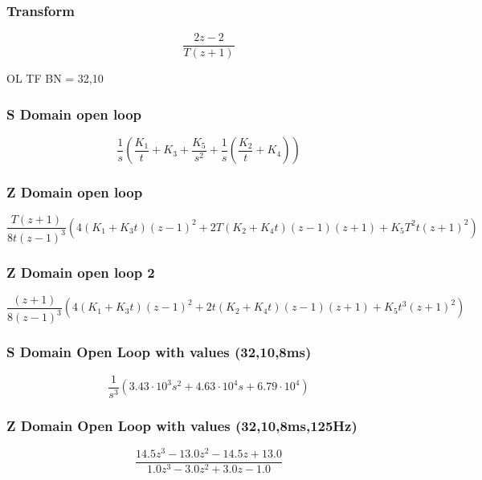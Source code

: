 \subsubsection{Transform}
\begin{equation}
\frac{2 z - 2}{T \left(z + 1\right)}
\end{equation}

OL TF BN = 32,10

\subsubsection{S Domain open loop}
\begin{equation}
\frac{1}{s} \left(\frac{K_{1}}{t} + K_{3} + \frac{K_{5}}{s^{2}} + \frac{1}{s} \left(\frac{K_{2}}{t} + K_{4}\right)\right)
\end{equation}

\subsubsection{Z Domain open loop}

\begin{equation}
\frac{T\left(z + 1\right) }{8 t \left(z - 1\right)^{3}} \left(4(K_{1}  + K_{3} t)  \left(z - 1\right)^{2}  + 2 T \left(K_{2} + K_{4} t\right) \left(z - 1\right) \left(z + 1\right) + K_{5} T^{2} t \left(z + 1\right)^{2} \right)
\end{equation}

\subsubsection{Z Domain open loop 2}
\begin{equation}
\frac{\left(z + 1\right)}{8 \left(z - 1\right)^{3}} \left(4(K_{1}  + K_{3} t)  \left(z - 1\right)^{2} + 2 t \left(K_{2} + K_{4} t\right) \left(z - 1\right) \left(z + 1\right) + K_{5} t^{3} \left(z + 1\right)^{2}\right)
\end{equation}


\subsubsection{S Domain Open Loop with values (32,10,8ms)}
\begin{equation}
\frac{1}{s^{3}} \left(3.43 \cdot 10^{3} s^{2} + 4.63 \cdot 10^{4} s + 6.79 \cdot 10^{4}\right)
\end{equation}


\subsubsection{Z Domain Open Loop with values (32,10,8ms,125Hz)}
\begin{equation}
\frac{14.5 z^{3} - 13.0 z^{2} - 14.5 z + 13.0}{1.0 z^{3} - 3.0 z^{2} + 3.0 z - 1.0}
\end{equation}





